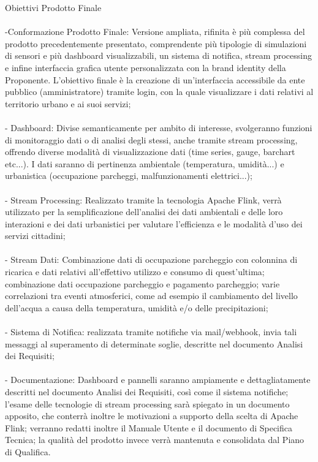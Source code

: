 \documentclass[8pt]{article}
\begin{document}
Obiettivi Prodotto Finale\\\\
-Conformazione Prodotto Finale: Versione ampliata, rifinita è più complessa del prodotto precedentemente presentato, comprendente più tipologie di simulazioni di sensori e più dashboard visualizzabili, un sistema di notifica, stream processing e infine interfaccia grafica utente personalizzata con la brand identity della Proponente. L'obiettivo finale è la creazione di un'interfaccia accessibile da ente pubblico (amministratore) tramite login, con la quale visualizzare i dati relativi al territorio urbano e ai suoi servizi;\\\\

- Dashboard: Divise semanticamente per ambito di interesse, svolgeranno funzioni di monitoraggio dati o di analisi degli stessi, anche tramite stream processing, offrendo diverse modalità di visualizzazione dati (time series, gauge, barchart etc...). I dati saranno di pertinenza ambientale (temperatura, umidità...) e urbanistica (occupazione parcheggi, malfunzionamenti elettrici...);\\\\

- Stream Processing: Realizzato tramite la tecnologia Apache Flink, verrà utilizzato per la semplificazione dell'analisi dei dati ambientali e delle loro interazioni e dei dati urbanistici per valutare l'efficienza e le modalità d'uso dei servizi cittadini;\\\\

- Stream Dati: Combinazione dati di occupazione parcheggio con colonnina di ricarica e dati relativi all'effettivo utilizzo e consumo di quest'ultima; combinazione dati occupazione parcheggio e pagamento parcheggio; varie correlazioni tra eventi atmosferici, come ad esempio il cambiamento del livello dell'acqua a causa della temperatura, umidità e/o delle precipitazioni;\\\\

- Sistema di Notifica: realizzata tramite notifiche via mail/webhook, invia tali messaggi al superamento di determinate soglie, descritte nel documento Analisi dei Requisiti;\\\\

- Documentazione: Dashboard e pannelli saranno ampiamente e dettagliatamente descritti nel documento Analisi dei Requisiti, così come il sistema notifiche; l'esame delle tecnologie di stream processing sarà spiegato in un documento apposito, che conterrà inoltre le motivazioni a supporto della scelta di Apache Flink; verranno redatti inoltre il Manuale Utente e il documento di Specifica Tecnica; la qualità del prodotto invece verrà mantenuta e consolidata dal Piano di Qualifica.\\\\
\end{document}
